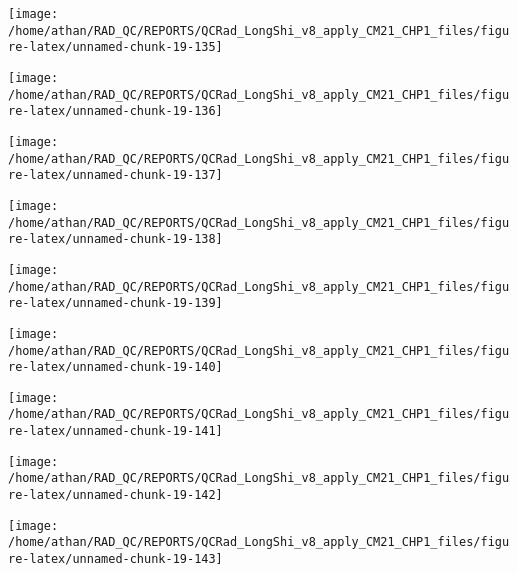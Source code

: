 \documentclass[
  10pt,
  a4paper,oneside]{article}
\begin{document}
\begin{center}\texttt{[image: /home/athan/RAD\_QC/REPORTS/QCRad\_LongShi\_v8\_apply\_CM21\_CHP1\_files/figure-latex/unnamed-chunk-19-135]} \end{center}

\begin{center}\texttt{[image: /home/athan/RAD\_QC/REPORTS/QCRad\_LongShi\_v8\_apply\_CM21\_CHP1\_files/figure-latex/unnamed-chunk-19-136]} \end{center}

\begin{center}\texttt{[image: /home/athan/RAD\_QC/REPORTS/QCRad\_LongShi\_v8\_apply\_CM21\_CHP1\_files/figure-latex/unnamed-chunk-19-137]} \end{center}

\begin{center}\texttt{[image: /home/athan/RAD\_QC/REPORTS/QCRad\_LongShi\_v8\_apply\_CM21\_CHP1\_files/figure-latex/unnamed-chunk-19-138]} \end{center}

\begin{center}\texttt{[image: /home/athan/RAD\_QC/REPORTS/QCRad\_LongShi\_v8\_apply\_CM21\_CHP1\_files/figure-latex/unnamed-chunk-19-139]} \end{center}

\begin{center}\texttt{[image: /home/athan/RAD\_QC/REPORTS/QCRad\_LongShi\_v8\_apply\_CM21\_CHP1\_files/figure-latex/unnamed-chunk-19-140]} \end{center}

\begin{center}\texttt{[image: /home/athan/RAD\_QC/REPORTS/QCRad\_LongShi\_v8\_apply\_CM21\_CHP1\_files/figure-latex/unnamed-chunk-19-141]} \end{center}

\begin{center}\texttt{[image: /home/athan/RAD\_QC/REPORTS/QCRad\_LongShi\_v8\_apply\_CM21\_CHP1\_files/figure-latex/unnamed-chunk-19-142]} \end{center}

\begin{center}\texttt{[image: /home/athan/RAD\_QC/REPORTS/QCRad\_LongShi\_v8\_apply\_CM21\_CHP1\_files/figure-latex/unnamed-chunk-19-143]} \end{center}
\end{document}
